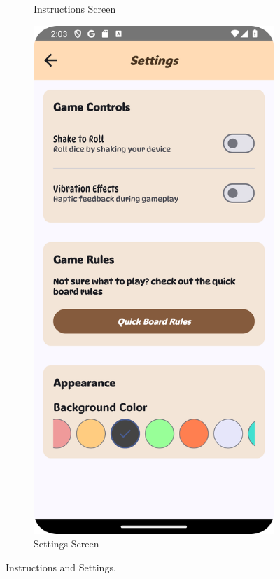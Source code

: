 \begin{figure}[h]
\begin{subfigure}[b]{0.27\textwidth}
        \caption{Instructions Screen}
        \label{fig:instructions_screen}
    \end{subfigure}
    \hspace{.5em}
    \begin{subfigure}[b]{0.27\textwidth}
        \centering
        \includegraphics[width=\textwidth]{img/settings screen.png}
        \caption{Settings Screen}
        \label{fig:settings_screen}
    \end{subfigure}
    \caption{Instructions and Settings.}
\end{figure}

